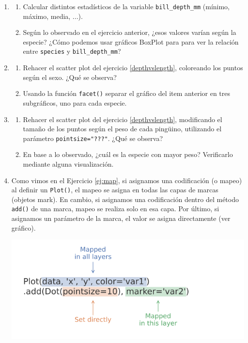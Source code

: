 \documentclass[a4paper,11pt]{article}
\theoremstyle{definition}
\begin{document}
\begin{enumerate}[resume]
\item \begin{enumerate}
\item Calcular distintos estadísticos de la variable \lstinline{bill_depth_mm} (mínimo, máximo, media, ...).
\item Según lo observado en el ejercicio anterior, ¿esos valores varían según la especie? ¿Cómo podemos usar gráficos BoxPlot para para ver la relaci\'on entre \lstinline{species} y \lstinline{bill_depth_mm}?
\end{enumerate}

\item
\begin{enumerate}
\item Rehacer el scatter plot del ejercicio \ref{depthvslength}, coloreando los puntos según el sexo. ¿Qué se observa?
\item Usando la función \lstinline{facet()} separar el gráfico del item anterior en tres subgráficos, uno para cada especie.
\end{enumerate}

\item 
\begin{enumerate}
\item Rehacer el scatter plot del ejercicio \ref{depthvslength}, modificando el tamaño de los puntos según el peso de cada pingüino, utilizando el parámetro \lstinline{pointsize="???"}. ¿Qué se observa?
\item En base a lo observado, ¿cuál es la especie con mayor peso? Verificarlo mediante alguna visualización.
\end{enumerate}

\item 
Como vimos en el Ejercicio \ref{ej:map}, si asignamos una codificación (o mapeo) al definir un \lstinline{Plot()}, el mapeo se asigna en todas las capas de marcas (objetos mark). En cambio, si asignamos una codificación dentro del método \lstinline{add()} de una marca, mapeo se realiza solo en esa capa. Por último, si asignamos un parámetro de la marca, el valor se asigna directamente (ver gráfico).

\begin{center}
\includegraphics[scale=0.5, align=c]{practica3-img-mappings.png}
\end{center}



\end{enumerate}
\end{document}
